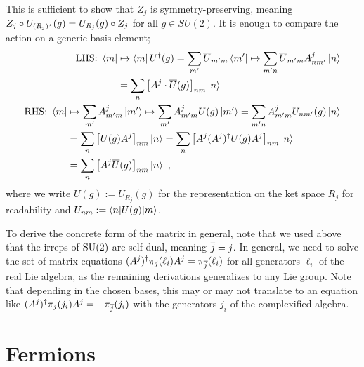 This is sufficient to show that $Z_j$ is symmetry-preserving, meaning $Z_j \circ U_{(R_j)^\star}(g) = U_{R_j}(g) \circ Z_j$ for all $g \in SU(2)$.
It is enough to compare the action on a generic basis element;
%
\begin{align}
    \begin{split}
        \text{LHS: }
        \bra{m}
        &\mapsto \bra{m} U^\dagger(g)
        = \sum_{m'} \overline{U}_{m'm} \bra{m'}
        \mapsto \sum_{m'n} \overline{U}_{m'm} A^j_{nm'} \ket{n}
        \\
        &= \sum_{n} \left[A^j \cdot \overline{U}(g)\right]_{nm} \ket{n}
    \end{split}
    \\
    \begin{split}
        \text{RHS: }
        \bra{m}
        &\mapsto \sum_{m'} A^j_{m'm} \ket{m'}
        \mapsto \sum_{m'} A^j_{m'm} U(g) \ket{m'}
        = \sum_{m'n} A^j_{m'm} U_{nm'}(g) \ket{n}
        \\
        &= \sum_{n} \left[U(g) A^j\right]_{nm} \ket{n}
        = \sum_{n} \left[A^j (A^j)^\dagger U(g) A^j\right]_{nm} \ket{n}
        \\
        &= \sum_{n} \left[A^j \overline{U}(g)\right]_{nm} \ket{n}
        ~,
    \end{split}
\end{align}
where we write $U(g) := U_{R_j}(g)$ for the representation on the ket space $R_j$ for readability and $U_{nm} := \braopket{n}{U(g)}{m}$.

To derive the concrete form of the matrix in general, note that we used above that the irreps of $\mathrm{SU}(2)$ are self-dual, meaning $\overline{j} = j$.
%
In general, we need to solve the set of matrix equations $(A^j)^\dagger \pi_j(\ell_i) A^j = \bar{\pi}_{\overline{j}}(\ell_i)$ for all generators $\ell_i$ of the real Lie algebra, as the remaining derivations generalizes to any Lie group.
%
Note that depending in the chosen bases, this may or may not translate to an equation like $(A^j)^\dagger \pi_j(j_i) A^j = -\pi_{\overline{j}}(j_i)$ with the generators $j_i$ of the complexified algebra.

\section{Fermions}
\label{sec:topo_data:ferm}

